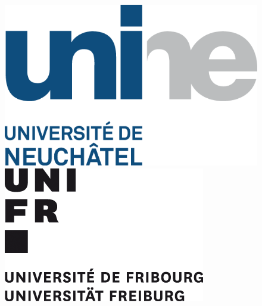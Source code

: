 \begin{center}
\begin{figure}[htp]
    \includegraphics[scale=0.30]{bilder/logos/UNI_Neuenburg.png}\hfill
    \includegraphics[scale=0.80]{bilder/logos/UNI_Fribourg.png}
  \end{figure}

\end{center}
